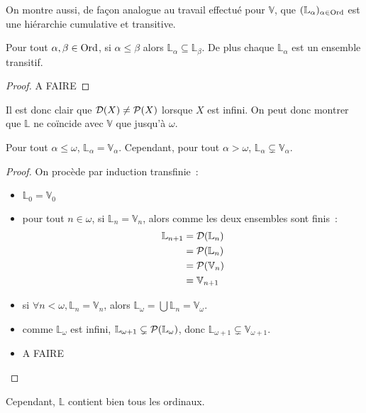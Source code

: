 On montre aussi, de façon analogue au travail effectué pour $\mathbb V$, que
$(\mathbb L_\alpha)_{\alpha \in \operatorname{Ord}}$ est une hiérarchie cumulative et transitive.

\begin{proposition}
  Pour tout $\alpha,\beta \in \operatorname{Ord}$, si $\alpha \leq \beta$ alors
  $\mathbb L_{\alpha} \subseteq \mathbb L_\beta$. De plus chaque
  $\mathbb L_\alpha$ est un ensemble transitif.
\end{proposition}

\begin{proof}
  A FAIRE
\end{proof}

Il est donc clair que $\mathcal{D}(X)\neq \mathcal{P}(X)$ lorsque $X$ est infini.
On peut donc montrer que $\mathbb L$ ne coïncide avec $\mathbb V$ que jusqu'à
$\omega$.

\begin{proposition}
  Pour tout $\alpha \leq \omega$, $\mathbb L_\alpha = \mathbb V_\alpha$.
  Cependant, pour tout $\alpha > \omega$,
  $\mathbb L_\alpha \subsetneq \mathbb V_\alpha$.
\end{proposition}

\begin{proof}
  On procède par induction transfinie~:
  \begin{itemize}
  \item $\mathbb L_0 = \mathbb V_0$
  \item pour tout $n \in \omega$, si $\mathbb L_n = \mathbb V_n$, alors comme
    les deux ensembles sont finis~:
    \begin{align*}
      \mathbb L_{n+1} &= \mathcal{D}(\mathbb L_n)\\
      &= \mathcal{P}(\mathbb L_n)\\
      &= \mathcal{P}(\mathbb V_n)\\
      &= \mathbb V_{n+1}
    \end{align*}
  \item si $\forall n < \omega, \mathbb L_n = \mathbb V_n$, alors
    $\mathbb L_\omega = \bigcup \mathbb L_n = \mathbb V_\omega$.
  \item comme $\mathbb L_\omega$ est infini,
    $\mathbb L_{\omega+1} \subsetneq \mathcal{P}(\mathbb L_\omega)$, donc
    $\mathbb L_{\omega+1} \subsetneq\mathbb V_{\omega+1}$.
  \item A FAIRE
  \end{itemize}
\end{proof}

Cependant, $\mathbb L$ contient bien tous les ordinaux.

